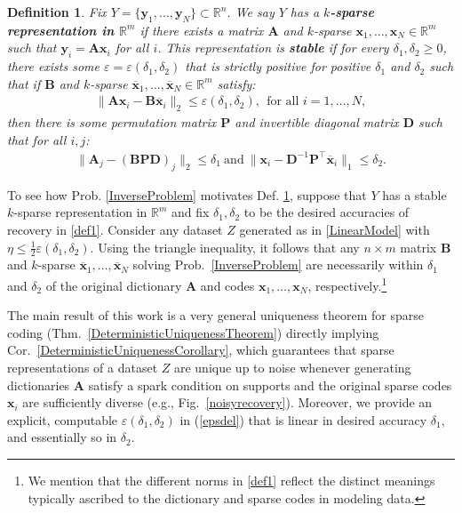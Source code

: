 \documentclass[journal, twocolumn]{IEEEtran}
\newtheorem{definition}{Definition}
\begin{document}
\begin{definition}\label{maindef}
Fix $Y = \{ \mathbf{y}_1, \ldots, \mathbf{y}_N\} \subset \mathbb{R}^n$. We say $Y$ has a \textbf{$k$-sparse representation in $\mathbb{R}^m$} if there exists a matrix $\mathbf{A}$ and $k$-sparse $\mathbf{x}_1, \ldots, \mathbf{x}_N \in \mathbb{R}^m$ such that $\mathbf{y}_i = \mathbf{A}\mathbf{x}_i$ for all $i$. 
This representation is \textbf{stable} if for every $\delta_1, \delta_2 \geq 0$, there exists some $\varepsilon = \varepsilon(\delta_1, \delta_2)$ that is strictly positive for positive $\delta_1$ and $\delta_2$ such that if $\mathbf{B}$ and $k$-sparse $\mathbf{\overline x}_1, \ldots, \mathbf{\overline x}_N \in \mathbb{R}^m$ satisfy:
\begin{align*}
	\|\mathbf{A}\mathbf{x}_i - \mathbf{B}\mathbf{\overline x}_i\|_2 \leq \varepsilon(\delta_1, \delta_2),\ \   \text{for all $i=1,\ldots,N$},
\end{align*}
then there is some permutation matrix $\mathbf{P}$ and invertible diagonal matrix $\mathbf{D}$ such that for all $i, j$:
\begin{align}\label{def1}
\|\mathbf{A}_j - (\mathbf{BPD})_j\|_2 \leq \delta_1 \ \text{and} \ \|\mathbf{x}_i - \mathbf{D}^{-1}\mathbf{P}^{\top}\mathbf{\overline x}_i\|_1 \leq \delta_2.
\end{align}
\end{definition}

To see how Prob. \ref{InverseProblem} motivates Def. \ref{maindef}, suppose that $Y$ has a stable $k$-sparse representation in $\mathbb{R}^m$ and fix $\delta_1, \delta_2$ to be the desired accuracies of recovery in \eqref{def1}. Consider any dataset $Z$ generated as in \eqref{LinearModel} with $\eta \leq \frac{1}{2} \varepsilon(\delta_1, \delta_2)$. Using the triangle inequality, it follows that any $n \times m$ matrix $\mathbf{B}$ and $k$-sparse $\mathbf{\overline x}_1, \ldots, \mathbf{\overline x}_N$ solving Prob.~\ref{InverseProblem} are necessarily within $\delta_1$ and $\delta_2$ of the original dictionary $\mathbf{A}$ and codes $\mathbf{x}_1, \ldots, \mathbf{x}_N$, respectively.\footnote{We mention that the different norms in \eqref{def1} reflect the distinct meanings typically ascribed to the dictionary and sparse codes in modeling data.}

The main result of this work is a very general uniqueness theorem for sparse coding (Thm.~\ref{DeterministicUniquenessTheorem}) directly 
implying Cor.~\ref{DeterministicUniquenessCorollary}, which guarantees that sparse representations of a dataset $Z$ are unique up to noise whenever generating dictionaries $\mathbf{A}$ satisfy a spark condition on supports and the original sparse codes $\mathbf{x}_i$ are sufficiently diverse (e.g., Fig.~\ref{noisyrecovery}).  Moreover, we provide an explicit, computable $\varepsilon(\delta_1, \delta_2)$ in (\ref{epsdel}) that is linear in desired accuracy $\delta_1$, and essentially so in $\delta_2$.
\end{document}
